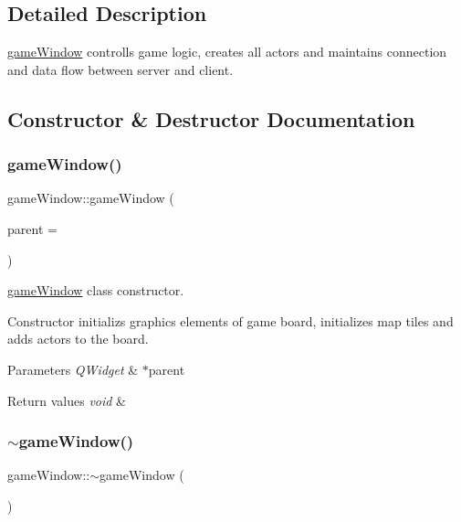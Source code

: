 \subsection{Detailed Description}
\mbox{\hyperlink{classgame_window}{game\+Window}} controlls game logic, creates all actors and maintains connection and data flow between server and client. 

\subsection{Constructor \& Destructor Documentation}
\mbox{\label{classgame_window_af31e4cb1c92ed36e03ef264c8d4efa51}} 
\subsubsection{\texorpdfstring{game\+Window()}{gameWindow()}}
{\footnotesize\ttfamily game\+Window\+::game\+Window (\begin{DoxyParamCaption}\item[{Q\+Widget $\ast$}]{parent = {} }\end{DoxyParamCaption})\hspace{0.3cm}{\ttfamily [explicit]}}



\mbox{\hyperlink{classgame_window}{game\+Window}} class constructor. 

Constructor initializs graphics elements of game board, initializes map tiles and adds actors to the board. 
\begin{DoxyParams}{Parameters}
{\em Q\+Widget} & $\ast$parent \\
\hline
\end{DoxyParams}

\begin{DoxyRetVals}{Return values}
{\em void} & \\
\hline
\end{DoxyRetVals}
\mbox{\label{classgame_window_a13773b6a92bc1d9a7e0067ed99fa4e20}} 
\subsubsection{\texorpdfstring{$\sim$game\+Window()}{~gameWindow()}}
{\footnotesize\ttfamily game\+Window\+::$\sim$game\+Window (\begin{DoxyParamCaption}{ }\end{DoxyParamCaption})}



